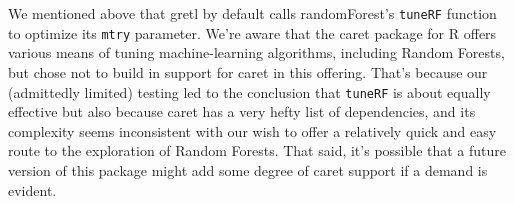 \documentclass{article}
\begin{document}
We mentioned above that gretl by default calls \textsf{randomForest}'s
\texttt{tuneRF} function to optimize its \texttt{mtry}
parameter. We're aware that the \textsf{caret} package for \textsf{R}
offers various means of tuning machine-learning algorithms, including
Random Forests, but chose not to build in support for \textsf{caret}
in this offering. That's because our (admittedly limited) testing led
to the conclusion that \texttt{tuneRF} is about equally effective but
also because \textsf{caret} has a very hefty list of dependencies, and
its complexity seems inconsistent with our wish to offer a relatively
quick and easy route to the exploration of Random Forests. That said,
it's possible that a future version of this package might add some
degree of \textsf{caret} support if a demand is evident.
\end{document}
